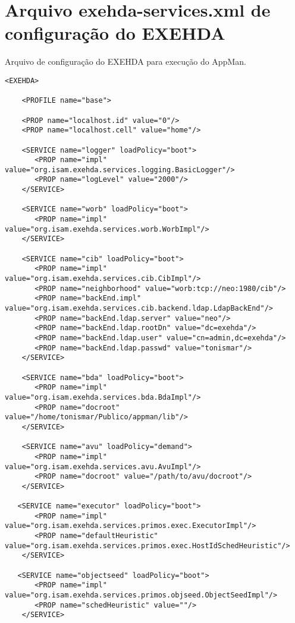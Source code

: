 \appendix
{}
\chapter{Arquivo exehda-services.xml de configuração do EXEHDA}
\label{anexo:exehda-services}

Arquivo de configuração do EXEHDA para execução do AppMan.

\begin{scriptsize}
\begin{verbatim}
<EXEHDA>

    <PROFILE name="base">

    <PROP name="localhost.id" value="0"/>
    <PROP name="localhost.cell" value="home"/>

    <SERVICE name="logger" loadPolicy="boot">
       <PROP name="impl" value="org.isam.exehda.services.logging.BasicLogger"/>
       <PROP name="logLevel" value="2000"/>
    </SERVICE>

    <SERVICE name="worb" loadPolicy="boot">
       <PROP name="impl" value="org.isam.exehda.services.worb.WorbImpl"/>
    </SERVICE>

    <SERVICE name="cib" loadPolicy="boot">
       <PROP name="impl" value="org.isam.exehda.services.cib.CibImpl"/>
       <PROP name="neighborhood" value="worb:tcp://neo:1980/cib"/>
       <PROP name="backEnd.impl" value="org.isam.exehda.services.cib.backend.ldap.LdapBackEnd"/>
       <PROP name="backEnd.ldap.server" value="neo"/>
       <PROP name="backEnd.ldap.rootDn" value="dc=exehda"/>
       <PROP name="backEnd.ldap.user" value="cn=admin,dc=exehda"/>
       <PROP name="backEnd.ldap.passwd" value="tonismar"/>
    </SERVICE>

    <SERVICE name="bda" loadPolicy="boot">
       <PROP name="impl" value="org.isam.exehda.services.bda.BdaImpl"/>
       <PROP name="docroot" value="/home/tonismar/Publico/appman/lib"/>
    </SERVICE>

    <SERVICE name="avu" loadPolicy="demand">
       <PROP name="impl" value="org.isam.exehda.services.avu.AvuImpl"/>
       <PROP name="docroot" value="/path/to/avu/docroot"/>
    </SERVICE>

   <SERVICE name="executor" loadPolicy="boot">
       <PROP name="impl" value="org.isam.exehda.services.primos.exec.ExecutorImpl"/>
       <PROP name="defaultHeuristic" value="org.isam.exehda.services.primos.exec.HostIdSchedHeuristic"/>
    </SERVICE>

   <SERVICE name="objectseed" loadPolicy="boot">
       <PROP name="impl" value="org.isam.exehda.services.primos.objseed.ObjectSeedImpl"/>
       <PROP name="schedHeuristic" value=""/>
    </SERVICE>


\end{verbatim}
\end{scriptsize}
